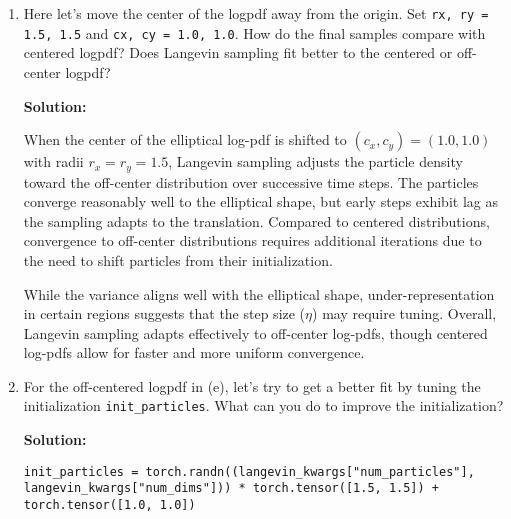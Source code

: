 \documentclass{article}
\newenvironment{solution}{\color{blue} \smallskip \textbf{Solution:}}{}
\begin{document}
\begin{enumerate}
    \begin{solution}
eta = torch.tensor([1e-2, 100e-3]) \\\\\\\\\\\\\\


    \end{solution}

    \item 
    Here let's move the center of the logpdf away from the origin. 
    Set \texttt{rx, ry = 1.5, 1.5} and \texttt{cx, cy = 1.0, 1.0}. 
    How do the final samples compare with centered logpdf? 
    Does Langevin sampling fit better to the centered or off-center logpdf?

    \begin{solution}


When the center of the elliptical log-pdf is shifted to \( (c_x, c_y) = (1.0, 1.0) \) with radii \( r_x = r_y = 1.5 \), Langevin sampling adjusts the particle density toward the off-center distribution over successive time steps. The particles converge reasonably well to the elliptical shape, but early steps exhibit lag as the sampling adapts to the translation. Compared to centered distributions, convergence to off-center distributions requires additional iterations due to the need to shift particles from their initialization. 

While the variance aligns well with the elliptical shape, under-representation in certain regions suggests that the step size (\( \eta \)) may require tuning. Overall, Langevin sampling adapts effectively to off-center log-pdfs, though centered log-pdfs allow for faster and more uniform convergence.\\




    \end{solution}

    \item 
    For the off-centered logpdf in (e), let's try to get a better fit by tuning the initialization
    \texttt{init\_particles}. What can you do to improve the initialization?

    \begin{solution}
\begin{verbatim}
init_particles = torch.randn((langevin_kwargs["num_particles"], langevin_kwargs["num_dims"])) * torch.tensor([1.5, 1.5]) + torch.tensor([1.0, 1.0])
\end{verbatim}


\end{solution}
\end{enumerate}
\end{document}
